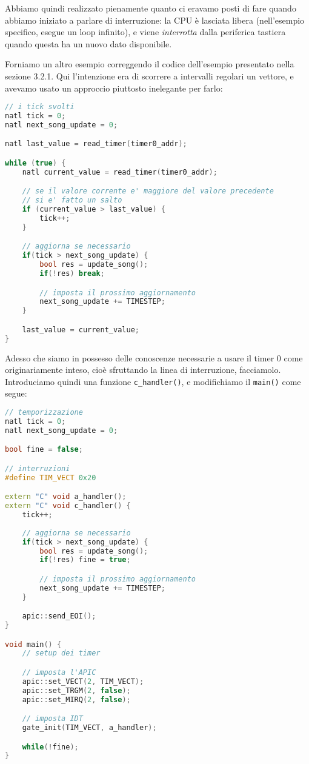 \documentclass[a4paper,11pt]{article}
\begin{document}
Abbiamo quindi realizzato pienamente quanto ci eravamo posti di fare quando abbiamo iniziato a parlare di interruzione: la CPU è lasciata libera (nell'esempio specifico, esegue un loop infinito), e viene \textit{interrotta} dalla periferica tastiera quando questa ha un nuovo dato disponibile.

\par\medskip

Forniamo un altro esempio correggendo il codice dell'esempio presentato nella sezione 3.2.1.
Qui l'intenzione era di scorrere a intervalli regolari un vettore, e avevamo usato un approccio piuttosto inelegante per farlo: 
\begin{lstlisting}[language=C++, style=codestyle]	
// i tick svolti
natl tick = 0;
natl next_song_update = 0;

natl last_value = read_timer(timer0_addr);

while (true) {
	natl current_value = read_timer(timer0_addr);

	// se il valore corrente e' maggiore del valore precedente 
	// si e' fatto un salto
	if (current_value > last_value) {
		tick++;
	}

	// aggiorna se necessario
	if(tick > next_song_update) {
		bool res = update_song();
		if(!res) break;

		// imposta il prossimo aggiornamento
		next_song_update += TIMESTEP;
	}

	last_value = current_value;
}
\end{lstlisting}

Adesso che siamo in possesso delle conoscenze necessarie a usare il timer 0 come originariamente inteso, cioè sfruttando la linea di interruzione, facciamolo.
Introduciamo quindi una funzione \lstinline|c_handler()|, e modifichiamo il \lstinline|main()| come segue:
\begin{lstlisting}[language=C++, style=codestyle]
// temporizzazione
natl tick = 0;
natl next_song_update = 0;

bool fine = false;

// interruzioni
#define TIM_VECT 0x20

extern "C" void a_handler();
extern "C" void c_handler() {
	tick++;
	
	// aggiorna se necessario
	if(tick > next_song_update) {
		bool res = update_song();
		if(!res) fine = true; 

		// imposta il prossimo aggiornamento
		next_song_update += TIMESTEP;
	}

	apic::send_EOI();
}

void main() {
	// setup dei timer

	// imposta l'APIC
	apic::set_VECT(2, TIM_VECT);
	apic::set_TRGM(2, false);
	apic::set_MIRQ(2, false);

	// imposta IDT
	gate_init(TIM_VECT, a_handler);

	while(!fine);
}
\end{lstlisting}
\end{document}
